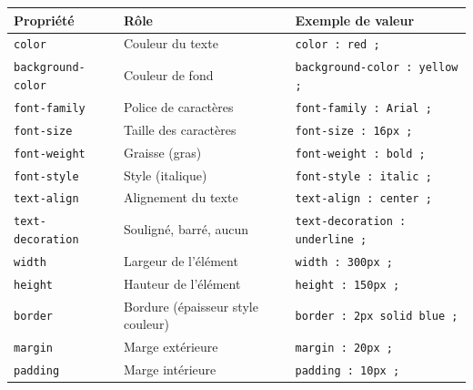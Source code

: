 \documentclass[11pt]{article}
\begin{document}
\begin{aretenir}
\begin{center}
\begin{tabularx}{\linewidth}{|l|l|X|}
\hline
\rowcolor{popblueL} \textbf{Propriété} & \textbf{Rôle} & \textbf{Exemple de valeur} \\
\hline
\texttt{color} & Couleur du texte & \texttt{color : red ;} \\
\hline
\texttt{background-color} & Couleur de fond & \texttt{background-color : yellow ;} \\
\hline
\texttt{font-family} & Police de caractères & \texttt{font-family : Arial ;} \\
\hline
\texttt{font-size} & Taille des caractères & \texttt{font-size : 16px ;} \\
\hline
\texttt{font-weight} & Graisse (gras) & \texttt{font-weight : bold ;} \\
\hline
\texttt{font-style} & Style (italique) & \texttt{font-style : italic ;} \\
\hline
\texttt{text-align} & Alignement du texte & \texttt{text-align : center ;} \\
\hline
\texttt{text-decoration} & Souligné, barré, aucun & \texttt{text-decoration : underline ;} \\
\hline
\texttt{width} & Largeur de l'élément & \texttt{width : 300px ;} \\
\hline
\texttt{height} & Hauteur de l'élément & \texttt{height : 150px ;} \\
\hline
\texttt{border} & Bordure (épaisseur style couleur) & \texttt{border : 2px solid blue ;} \\
\hline
\texttt{margin} & Marge extérieure & \texttt{margin : 20px ;} \\
\hline
\texttt{padding} & Marge intérieure & \texttt{padding : 10px ;} \\
\hline
\end{tabularx}
\end{center}
\end{aretenir}
\end{document}

